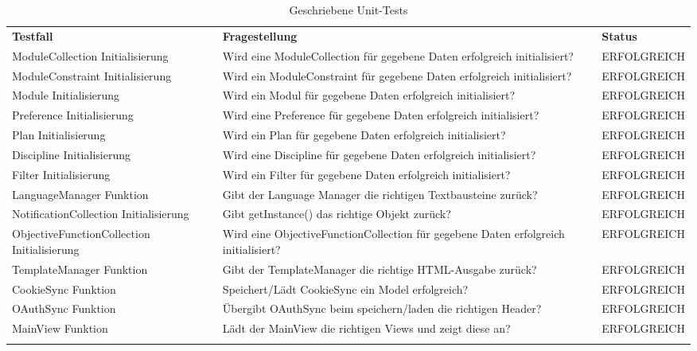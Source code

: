 \begin{longtable}{| >{\hspace{0pt}} p{} | >{\hspace{0pt}} p{} | >{\hspace{0pt}} p{} |}
	\hline
	\textbf{Testfall} & \textbf{Fragestellung} & \textbf{Status} \\ 
	\hhline{|=|=|=|}  
	\endfirsthead
	\endhead
	
	ModuleCollection Initialisierung & Wird eine ModuleCollection für gegebene Daten erfolgreich initialisiert?  & ERFOLGREICH \\
	ModuleConstraint Initialisierung & Wird ein ModuleConstraint für gegebene Daten erfolgreich initialisiert? & ERFOLGREICH \\
	Module Initialisierung & Wird ein Modul für gegebene Daten erfolgreich initialisiert? & ERFOLGREICH \\
	Preference Initialisierung & Wird eine Preference für gegebene Daten erfolgreich initialisiert? & ERFOLGREICH \\
	Plan Initialisierung & Wird ein Plan für gegebene Daten erfolgreich initialisiert? & ERFOLGREICH \\
	Discipline Initialisierung & Wird eine Discipline für gegebene Daten erfolgreich initialisiert? & ERFOLGREICH \\
	Filter Initialisierung & Wird ein Filter für gegebene Daten erfolgreich initialisiert? & ERFOLGREICH \\
	LanguageManager Funktion & Gibt der Language Manager die richtigen Textbausteine zurück? & ERFOLGREICH \\
	NotificationCollection Initialisierung & Gibt getInstance() das richtige Objekt zurück? & ERFOLGREICH \\
	ObjectiveFunctionCollection Initialisierung & Wird eine ObjectiveFunctionCollection für gegebene Daten erfolgreich initialisiert? & ERFOLGREICH \\
	TemplateManager Funktion & Gibt der TemplateManager die richtige HTML-Ausgabe zurück? & ERFOLGREICH \\
	CookieSync Funktion & Speichert/Lädt CookieSync ein Model erfolgreich? & ERFOLGREICH \\
	OAuthSync Funktion & Übergibt OAuthSync beim speichern/laden die richtigen Header? & ERFOLGREICH \\
	MainView Funktion & Lädt der MainView die richtigen Views und zeigt diese an? & ERFOLGREICH \\	
	\hhline{|=|=|=|}   
	\caption{Geschriebene Unit-Tests}
\end{longtable}